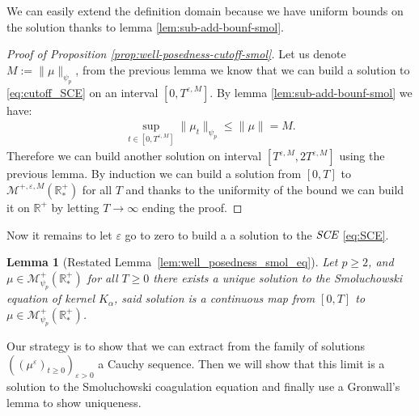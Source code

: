 \documentclass[11pt,a4paper]{article}
\newcommand{\RR}{\mathbb{R}}
\newcommand{\RRP}{\mathbb{R}^+_*}
\newcommand{\MC}{\mathcal{M}}
\newcommand{\SCE}{\emph{SCE}}
\newcommand{\Proc}[1]{\left(#1\right)_{t\geq 0}}
\newtheorem{lemma}[theorem]{Lemma}
\begin{document}
We can easily extend the definition domain because we have uniform bounds on the solution thanks to lemma \ref{lem:sub-add-bounf-smol}.
\begin{proof}[Proof of Proposition \ref{prop:well-posedness-cutoff-smol}]
    Let us denote $M:= \|\mu\|_{\psi_p}$, from the previous lemma we know that we can build a solution to \eqref{eq:cutoff_SCE} on an interval $\left[0,T^{\varepsilon,M}\right]$. By lemma \ref{lem:sub-add-bounf-smol} we have:
    \begin{align*}
        \sup\limits_{t \in \left[0,T^{\varepsilon,M}\right]} \|\mu_t\|_{\psi_p} \leq \|\mu\| = M.
    \end{align*}
    Therefore we can build another solution on interval $\left[T^{\varepsilon,M}, 2T^{\varepsilon,M}\right]$ using the previous lemma. By induction we can build a solution from $[0,T]$ to $\MC^{+,\varepsilon,M}\left(\RRP\right)$ for all $T$ and thanks to the uniformity of the bound we can build it on $\RR^{+}$ by letting $T \to \infty$ ending the proof.
\end{proof}
Now it remains to let $\varepsilon$ go to zero to build a a solution to the $\SCE$ \eqref{eq:SCE}. 
\begin{lemma}[Restated Lemma~\ref{lem:well_posedness_smol_eq}]
    Let $p \geq 2$, and $\mu \in \MC_{\psi_p}^+ (\RRP)$ for all $T \geq 0$ there exists a unique solution to the Smoluchowski equation of kernel $K_\alpha$, said solution is a continuous map from $[0,T]$ to $\mu \in \MC_{\psi_p}^+ (\RRP)$.
\end{lemma}
Our strategy is to show that we can extract from the family of solutions $\left(\Proc{\mu^\varepsilon}\right)_{\varepsilon > 0}$ a Cauchy sequence. Then we will show that this limit is a solution to the Smoluchowski coagulation equation and finally use a Gronwall's lemma to show uniqueness. 
\end{document}
